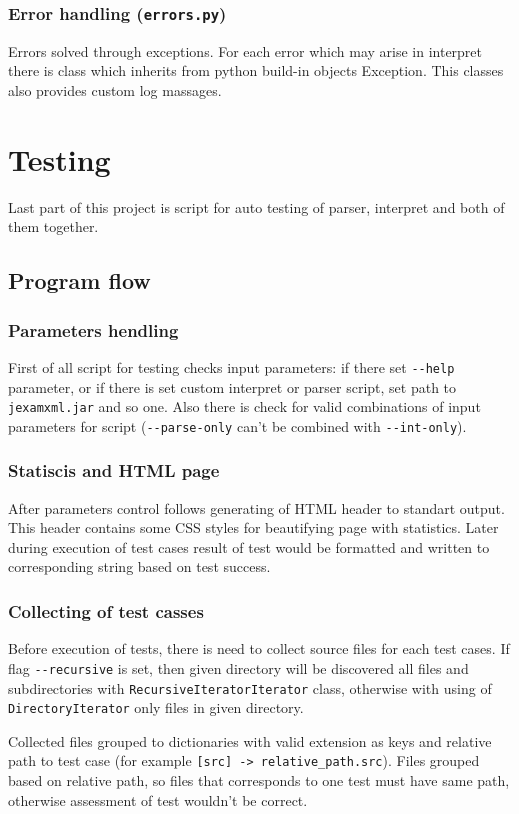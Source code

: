 \documentclass[10pt,a4paper]{article}
\begin{document}
\subsubsection{Error handling (\texttt{errors.py})}

Errors solved through exceptions. For each error which may arise in interpret 
there is class which inherits from python build-in objects Exception. This 
classes also provides custom log massages.  

\section{Testing}

Last part of this project is script for auto testing of parser, interpret and 
both of them together. 

\subsection{Program flow}

\subsubsection{Parameters hendling}

First of all script for testing checks input parameters: if there set 
\texttt{-{}-help} parameter, or if there is set custom interpret or parser 
script, set path to \texttt{jexamxml.jar} and so one. Also there is check for 
valid combinations of input parameters for script (\texttt{-{}-parse-only} can't 
be combined with \texttt{-{}-int-only}).

\subsubsection{Statiscis and HTML page}

After parameters control follows generating of HTML header to standart output. 
This header contains some CSS styles for beautifying page with statistics.  
Later during execution of test cases result of test would be formatted and 
written to corresponding string based on test success.   

\subsubsection{Collecting of test casses}

Before execution of tests, there is need to collect source files for each test 
cases. If flag \texttt{-{}-recursive} is set, then given directory will be 
discovered all files and subdirectories with \texttt{RecursiveIteratorIterator} 
class, otherwise with using of \texttt{DirectoryIterator} only files in given 
directory.

Collected files grouped to dictionaries with valid extension as keys and relative
path to test case (for example \texttt{[src] -> relative\_path.src}). Files 
grouped based on relative path, so files that corresponds to one test must have 
same path, otherwise assessment of test wouldn't be correct. 
\end{document}
